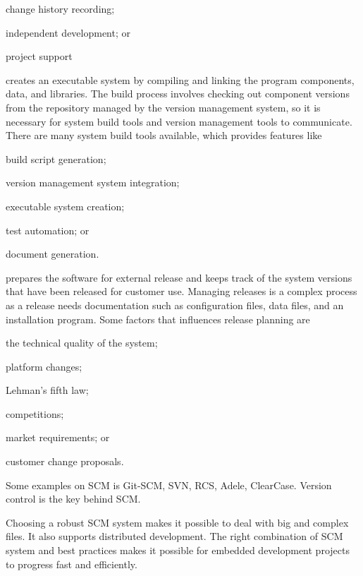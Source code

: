 \begin{description}
\begin{inparaenum}
		\item change history recording;
		\item independent development; or
		\item project support
	\end{inparaenum}
	\item[System building] creates an executable system by compiling and linking the program components, data, and libraries. The build process involves checking out component versions from the repository managed by the version management system, so it is necessary for system build tools and version management tools to communicate. There are many system build tools available, which provides features like 
	\begin{inparaenum}
		\item build script generation;
		\item version management system integration;
		\item executable system creation;
		\item test automation; or
		\item document generation.
	\end{inparaenum}
	\item[Release management] prepares the software for external release and keeps track of the system versions that have been released for customer use. Managing releases is a complex process as a release needs documentation such as configuration files, data files, and an installation program. Some factors that influences release planning are
	\begin{inparaenum}
		\item the technical quality of the system;
		\item platform changes;
		\item Lehman's fifth law;
		\item competitions;
		\item market requirements; or
		\item customer change proposals.
	\end{inparaenum}
\end{description}

Some examples on SCM is Git-SCM, SVN, RCS, Adele, ClearCase. Version control is the key behind SCM. 

Choosing a robust SCM system makes it possible to deal with big and complex files. It also supports distributed development. The right combination of SCM system and best practices makes it possible for embedded development projects to progress fast and efficiently. 


